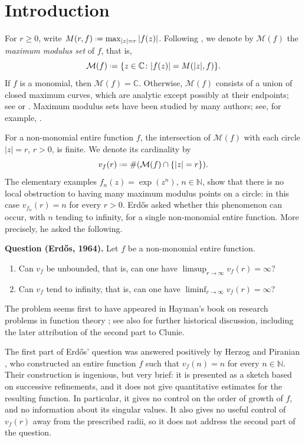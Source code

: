 \documentclass[a4paper, 11pt, reqno]{amsart}
\numberwithin{equation}{section}
\theoremstyle{plain}
\newcommand*{\defeq}{\mathrel{\vcenter{\baselineskip0.5ex \lineskiplimit0pt
 \hbox{\scriptsize.}\hbox{\scriptsize.}}}=}
\theoremstyle{remark}
\newcommand{\C}{{\mathbb{C}}}
\newcommand{\N}{{\mathbb{N}}}
\newcommand{\M}{{\mathcal{M}}}
\begin{document}
\section{Introduction}
For \(r\geq 0\), write \(M(r,f)\defeq \max_{|z|=r}|f(z)|\). Following \cite{Sixsmithmax}, we denote by \(\M(f)\) the \emph{maximum modulus set} of \(f\), that is,
\begin{equation}
	\label{Mdef}
	\M(f)\defeq \{z\in\C\colon |f(z)|=M(|z|,f)\}.
\end{equation}
If \(f\) is a monomial, then \(\M(f)=\C\). Otherwise, \(\M(f)\) consists of a union of closed maximum curves, which are analytic except possibly at their endpoints; see \cite[Theorem 10]{valironlectures} or \cite{Blumenthal}. Maximum modulus sets have been studied by many authors; see, for example, \cite{hardy1909, jassimlondon,tyler,Csordas_1990,Blu_conj, letidave_polynomial}.

For a non-monomial entire function \(f\), the intersection of \(\M(f)\) with each circle \(|z|=r\), \(r>0\), is finite. We denote its cardinality by
\[
v_f(r)\defeq \#(\M(f)\cap\{|z|=r\}).
\]
The elementary examples \(f_n(z)=\exp(z^n)\), $n\in \N$, show that there is no local obstruction to having many maximum modulus points on a circle: in this case \(v_{f_n}(r)=n\) for every \(r>0\). Erd\H{o}s asked whether this phenomenon can occur, with \(n\) tending to infinity, for a single non-monomial entire function. More precisely, he asked the following.

\noindent\textbf{Question \textup{(Erd\H{o}s, 1964).}}
Let \(f\) be a non-monomial entire function.
\begin{enumerate}
	\item Can \(v_f\) be unbounded, that is, can one have \(\limsup_{r\to\infty}v_f(r)=\infty\)?
	\item Can \(v_f\) tend to infinity, that is, can one have \(\liminf_{r\to\infty}v_f(r)=\infty\)?
\end{enumerate}

\noindent
The problem seems first to have appeared in Hayman's book on research problems in function theory \cite{Hayman1967}; see also \cite{leti_Adi_Erdos} for further historical discussion, including the later attribution of the second part to Clunie.

The first part of Erd\H{o}s' question was answered positively by Herzog and Piranian \cite{HerzogPiranian1968}, who constructed an entire function \(f\) such that \(v_f(n)=n\) for every \(n\in\N\). Their construction is ingenious, but very brief: it is presented as a sketch based on successive refinements, and it does not give quantitative estimates for the resulting function. In particular, it gives no control on the order of growth of \(f\), and no information about its singular values. It also gives no useful control of \(v_f(r)\) away from the prescribed radii, so it does not address the second part of the question.
\end{document}
